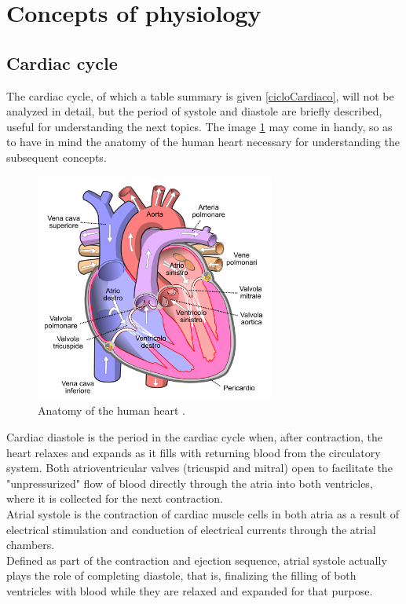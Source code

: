 \section{Concepts of physiology}

\subsection{Cardiac cycle}
The cardiac cycle, of which a table summary is given \ref{cicloCardiaco}, will not be analyzed in detail, but the period of systole and diastole are briefly described, useful for understanding the next topics. The image \ref{wiki: cuore} may come in handy, so as to have in mind the anatomy of the human heart necessary for understanding the subsequent concepts.

\begin{figure}[h]
    \centering
    \includegraphics[width=0.7\textwidth]{images/Windkessel/Cuore.png}
    \caption{Anatomy of the human heart \cite{wiki:cicloCardiaco}.}
    \label{wiki: cuore}
\end{figure}

Cardiac diastole is the period in the cardiac cycle when, after contraction, the heart relaxes and expands as it fills with returning blood from the circulatory system. Both atrioventricular valves (tricuspid and mitral) open to facilitate the "unpressurized" flow of blood directly through the atria into both ventricles, where it is collected for the next contraction. \\

Atrial systole is the contraction of cardiac muscle cells in both atria as a result of electrical stimulation and conduction of electrical currents through the atrial chambers. \\
Defined as part of the contraction and ejection sequence, atrial systole actually plays the role of completing diastole, that is, finalizing the filling of both ventricles with blood while they are relaxed and expanded for that purpose. 

